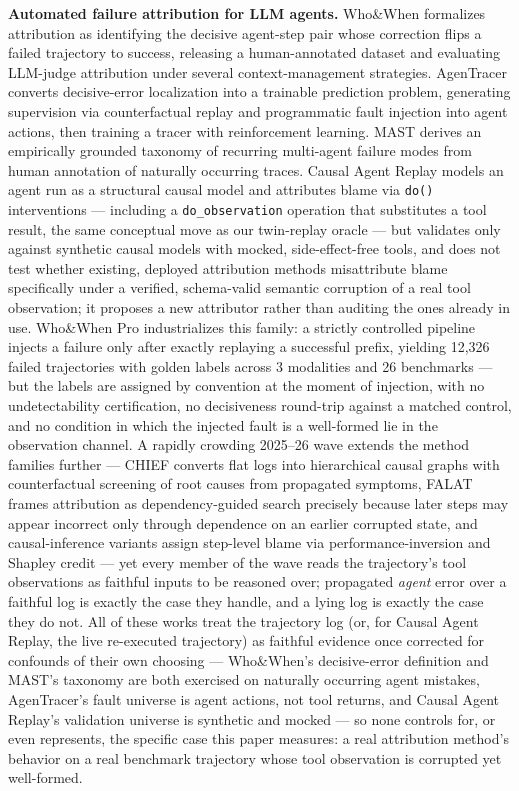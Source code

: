 \documentclass[11pt]{article}
\begin{document}
\textbf{Automated failure attribution for LLM agents.} Who\&When \citep{WhoWhenGazlTYxZss} formalizes attribution as identifying the decisive agent-step pair whose correction flips a failed trajectory to success, releasing a human-annotated dataset and evaluating LLM-judge attribution under several context-management strategies. AgenTracer \citep{AgenTracerl05DseqvuD} converts decisive-error localization into a trainable prediction problem, generating supervision via counterfactual replay and programmatic fault injection into agent actions, then training a tracer with reinforcement learning. MAST \citep{MAST250313657} derives an empirically grounded taxonomy of recurring multi-agent failure modes from human annotation of naturally occurring traces. Causal Agent Replay \citep{CausalAgentReplay260608275} models an agent run as a structural causal model and attributes blame via \texttt{do(\textperiodcentered)} interventions --- including a \texttt{do\_observation} operation that substitutes a tool result, the same conceptual move as our twin-replay oracle --- but validates only against synthetic causal models with mocked, side-effect-free tools, and does not test whether existing, deployed attribution methods misattribute blame specifically under a verified, schema-valid semantic corruption of a real tool observation; it proposes a new attributor rather than auditing the ones already in use. Who\&When Pro \citep{WhoWhenPro260709996} industrializes this family: a strictly controlled pipeline injects a failure only after exactly replaying a successful prefix, yielding 12,326 failed trajectories with golden labels across 3 modalities and 26 benchmarks --- but the labels are assigned by convention at the moment of injection, with no undetectability certification, no decisiveness round-trip against a matched control, and no condition in which the injected fault is a well-formed lie in the observation channel. A rapidly crowding 2025--26 wave extends the method families further --- CHIEF \citep{CHIEF260223701} converts flat logs into hierarchical causal graphs with counterfactual screening of root causes from propagated symptoms, FALAT \citep{FALAT260600765} frames attribution as dependency-guided search precisely because later steps may appear incorrect only through dependence on an earlier corrupted state, and causal-inference variants \citep{MaCausalAttr250908682} assign step-level blame via performance-inversion and Shapley credit --- yet every member of the wave reads the trajectory's tool observations as faithful inputs to be reasoned over; propagated \emph{agent} error over a faithful log is exactly the case they handle, and a lying log is exactly the case they do not. All of these works treat the trajectory log (or, for Causal Agent Replay, the live re-executed trajectory) as faithful evidence once corrected for confounds of their own choosing --- Who\&When's decisive-error definition and MAST's taxonomy are both exercised on naturally occurring agent mistakes, AgenTracer's fault universe is agent actions, not tool returns, and Causal Agent Replay's validation universe is synthetic and mocked --- so none controls for, or even represents, the specific case this paper measures: a real attribution method's behavior on a real benchmark trajectory whose tool observation is corrupted yet well-formed.
\end{document}
